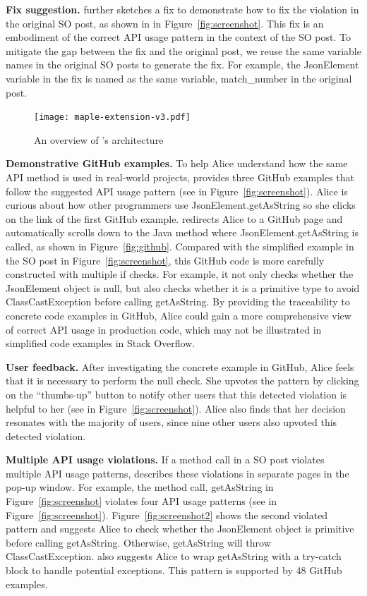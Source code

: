 {\bf Fix suggestion.} {\tool} further sketches a fix to demonstrate how to fix the violation in the original SO post, as shown in  in Figure~\ref{fig:screenshot}. This fix is an embodiment of the correct API usage pattern in the context of the SO post. To mitigate the gap between the fix and the original post, we reuse the same variable names in the original SO posts to generate the fix. For example, the {\ttt JsonElement} variable in the fix is named as the same variable, {\ttt match\_number} in the original post.

\begin{figure}[!th]
\centering
\texttt{[image: maple-extension-v3.pdf]}
\caption{An overview of {\tool}'s architecture}
\label{fig:arch}
\end{figure}

{\bf Demonstrative GitHub examples.} To help Alice understand how the same API method is used in real-world projects, {\tool} provides three GitHub examples that follow the suggested API usage pattern (see  in Figure~\ref{fig:screenshot}). Alice is curious about how other programmers use {\ttt JsonElement.getAsString} so she clicks on the link of the first GitHub example. {\tool} redirects Alice to a GitHub page and automatically scrolls down to the Java method where {\ttt JsonElement.getAsString} is called, as shown in Figure~\ref{fig:github}. Compared with the simplified example in the SO post in Figure~\ref{fig:screenshot}, this GitHub code is more carefully constructed with multiple {\ttt if} checks. For example, it not only checks whether the {\ttt JsonElement} object is {\ttt null}, but also checks whether it is a primitive type to avoid {\ttt ClassCastException} before calling {\ttt getAsString}. By providing the traceability to concrete code examples in GitHub, Alice could gain a more comprehensive view of correct API usage in production code, which may not be illustrated in simplified code examples in Stack Overflow. 

{\bf User feedback.} After investigating the concrete example in GitHub, Alice feels that it is necessary to perform the {\ttt null} check. She upvotes the pattern by clicking on the ``thumbs-up'' button to notify other users that this detected violation is helpful to her (see  in Figure~\ref{fig:screenshot}). Alice also finds that her decision resonates with the majority of {\tool} users, since nine other users also upvoted this detected violation.

{\bf Multiple API usage violations.} If a method call in a SO post violates multiple API usage patterns, {\tool} describes these violations in separate pages in the pop-up window. For example, the method call, {\ttt getAsString} in Figure~\ref{fig:screenshot} violates four API usage patterns (see  in Figure~\ref{fig:screenshot}). Figure~\ref{fig:screenshot2} shows the second violated pattern and suggests Alice to check whether the {\ttt JsonElement} object is primitive before calling {\ttt getAsString}. Otherwise, {\ttt getAsString} will throw {\ttt ClassCastException}. {\tool} also suggests Alice to wrap {\ttt getAsString} with a {\ttt try-catch} block to handle potential exceptions. This pattern is supported by 48 GitHub examples.

